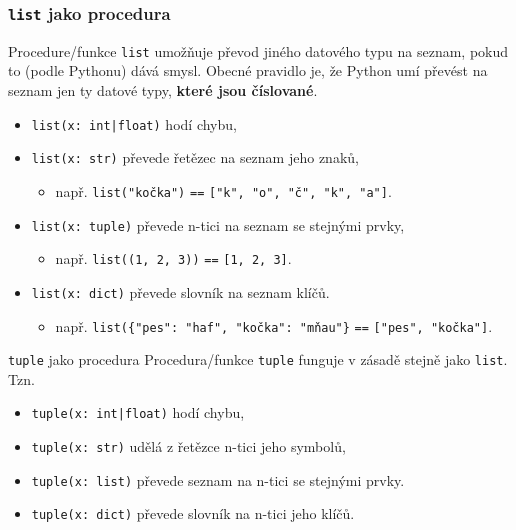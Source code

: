 \documentclass[aspectratio=169,11pt]{beamer}
\begin{document}
\begin{frame}
 \frametitle{\texttt{list} jako procedura}
 Procedure/funkce \texttt{\alert{list}} umožňuje převod jiného datového typu na
 seznam, pokud to (podle Pythonu) dává smysl. Obecné pravidlo je, že Python umí
 převést na seznam jen ty datové typy, \textbf{které jsou číslované}.
 \begin{itemize}
  \item<1-> \texttt{list(x: \alert{int}|\alert{float})} hodí chybu,
  \item<2-> \texttt{list(x: \alert{str})} převede řetězec na seznam jeho znaků,
   \begin{itemize}
    \item např. \texttt{list("kočka")} \texttt{==} \texttt{["k", "o", "č", "k",
     "a"]}.
   \end{itemize}
  \item<3-> \texttt{list(x: \alert{tuple})} převede n-tici na seznam se stejnými
   prvky,
   \begin{itemize}
    \item např. \texttt{list((1, 2, 3))} \texttt{==} \texttt{[1, 2, 3]}.
   \end{itemize}
  \item<4-> \texttt{list(x: \alert{dict})} převede slovník na seznam klíčů.
   \begin{itemize}
    \item např. \texttt{list(\{"pes": "haf", "kočka": "mňau"\}} \texttt{==}
     \texttt{["pes", "kočka"]}.
   \end{itemize}
 \end{itemize}
\end{frame}

\begin{frame}{\texttt{tuple} jako procedura}
 Procedura/funkce \alert{\texttt{tuple}} funguje v zásadě stejně jako
 \texttt{list}. Tzn.
 \pause
 \begin{itemize}
  \item \texttt{tuple(x: \alert{int}|\alert{float})} hodí chybu,
  \item \texttt{tuple(x: \alert{str})} udělá z řetězce n-tici jeho symbolů,
  \item \texttt{tuple(x: \alert{list})} převede seznam na n-tici se stejnými
   prvky.
  \item \texttt{tuple(x: \alert{dict})} převede slovník na n-tici jeho klíčů.
 \end{itemize}
\end{frame}
\end{document}
